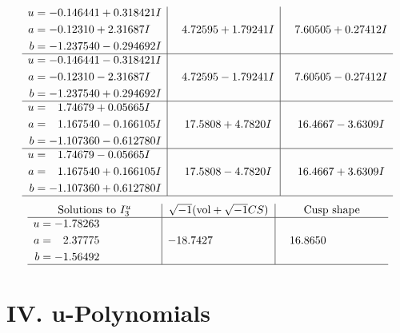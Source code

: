 \documentclass[1p]{elsarticle_modified}
\theoremstyle{definition}
\newcommand{\I}{\sqrt{-1}}
\begin{document}
$$\begin{array}{c|c|c}
\begin{aligned}
u &= -0.146441 + 0.318421 I \\
a &= -0.12310 + 2.31687 I \\
b &= -1.237540 - 0.294692 I\end{aligned}
 & \phantom{-}4.72595 + 1.79241 I & \phantom{-}7.60505 + 0.27412 I \\ \hline\begin{aligned}
u &= -0.146441 - 0.318421 I \\
a &= -0.12310 - 2.31687 I \\
b &= -1.237540 + 0.294692 I\end{aligned}
 & \phantom{-}4.72595 - 1.79241 I & \phantom{-}7.60505 - 0.27412 I \\ \hline\begin{aligned}
u &= \phantom{-}1.74679 + 0.05665 I \\
a &= \phantom{-}1.167540 - 0.166105 I \\
b &= -1.107360 - 0.612780 I\end{aligned}
 & \phantom{-}17.5808 + 4.7820 I & \phantom{-}16.4667 - 3.6309 I \\ \hline\begin{aligned}
u &= \phantom{-}1.74679 - 0.05665 I \\
a &= \phantom{-}1.167540 + 0.166105 I \\
b &= -1.107360 + 0.612780 I\end{aligned}
 & \phantom{-}17.5808 - 4.7820 I & \phantom{-}16.4667 + 3.6309 I\\
 \hline 
 \end{array}$$\newpage$$\begin{array}{c|c|c}  
\text{Solutions to }I^u_{3}& \I (\text{vol} + \sqrt{-1}CS) & \text{Cusp shape}\\
 \hline 
\begin{aligned}
u &= -1.78263\phantom{ +0.000000I} \\
a &= \phantom{-}2.37775\phantom{ +0.000000I} \\
b &= -1.56492\phantom{ +0.000000I}\end{aligned}
 & -18.7427\phantom{ +0.000000I} & \phantom{-}16.8650\phantom{ +0.000000I}\\
 \hline 
 \end{array}$$\newpage
\newpage\renewcommand{\arraystretch}{1}
\centering \section*{ IV. u-Polynomials}
\end{document}
